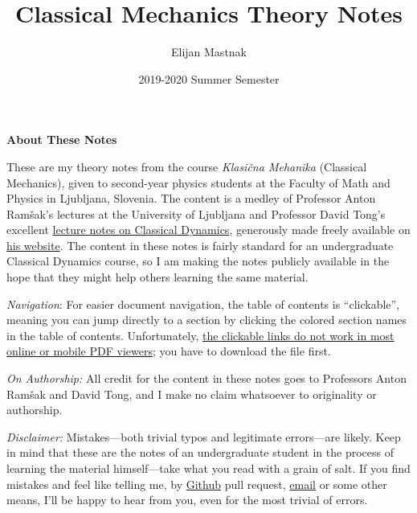 \documentclass[11pt, a4paper]{article}
\begin{document}
\title{Classical Mechanics Theory Notes}
\author{Elijan Mastnak}
\date{2019-2020 Summer Semester}
\maketitle

\begin{center}
	\textbf{About These Notes}
\end{center}

These are my theory notes from the course \textit{Klasi\v{c}na Mehanika} (Classical Mechanics), given to second-year physics students at the Faculty of Math and Physics in Ljubljana, Slovenia. The content is a medley of Professor Anton Ram\v{s}ak's lectures at the University of Ljubljana and Professor David Tong's excellent \href{http://www.damtp.cam.ac.uk/user/tong/dynamics.html}{lecture notes on Classical Dynamics}, generously made freely available on \href{http://www.damtp.cam.ac.uk/user/tong/teaching.html}{his website}.  The content in these notes is fairly standard for an undergraduate Classical Dynamics course, so I am making the notes publicly available in the hope that they might help others learning the same material.

\vspace{2mm}
\textit{Navigation}: For easier document navigation, the table of contents is ``clickable'', meaning you can jump directly to a section by clicking the colored section names in the table of contents. Unfortunately, \uline{the clickable links do not work in most online or mobile PDF viewers}; you have to download the file first.

\vspace{2mm}
\textit{On Authorship:} All credit for the content in these notes goes to Professors Anton Ram\v{s}ak and David Tong, and I make no claim whatsoever to originality or authorship. 

\vspace{2mm}
\textit{Disclaimer:} Mistakes---both trivial typos and legitimate errors---are likely. Keep in mind that these are the notes of an undergraduate student in the process of learning the material himself---take what you read with a grain of salt. If you find mistakes and feel like telling me, by \href{https://github.com/ejmastnak/fmf}{Github} pull request, \href{mailto:ejmastnak@gmail.com}{email} or some other means, I'll be happy to hear from you, even for the most trivial of errors.

\tableofcontents
\end{document}
